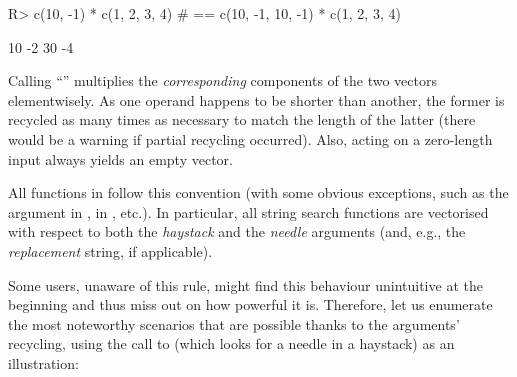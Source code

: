 \documentclass[nojss]{jss}
\begin{document}
\begin{Schunk}
\begin{Sinput}
R> c(10, -1) * c(1, 2, 3, 4)  # == c(10, -1, 10, -1) * c(1, 2, 3, 4)
\end{Sinput}
\begin{Soutput}
[1] 10 -2 30 -4
\end{Soutput}
\end{Schunk}

\noindent
Calling ``'' multiplies the \textit{corresponding} components
of the two vectors elementwisely. As one operand happens to be shorter
than another, the former is recycled as many times as necessary
to match the length of the latter (there would be a warning if partial
recycling occurred). Also, acting on a zero-length
input always yields an empty vector.


All functions in  follow this convention
(with some obvious exceptions, such as the 
argument in ,  in , etc.).
In particular, all string search functions are vectorised
with respect to both the  \textit{haystack} and the \textit{needle} arguments
(and, e.g., the \textit{replacement} string, if applicable).

Some users, unaware of this rule, might find this behaviour
unintuitive at the beginning and thus miss out on how powerful it is. Therefore, let us enumerate
the most noteworthy scenarios that are possible thanks to the arguments' recycling,
using the call to 
(which looks for a needle in a haystack)
as an illustration:
\end{document}
